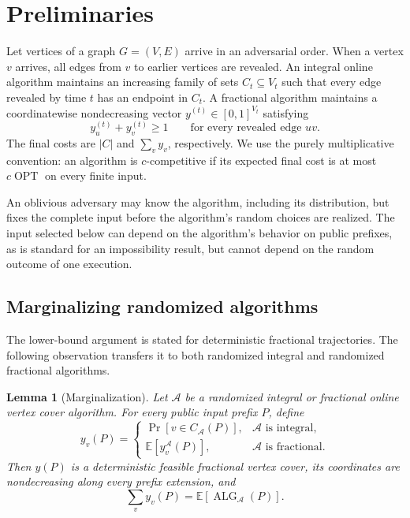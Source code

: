 \documentclass[11pt,letterpaper]{article}
\newtheorem{lemma}[theorem]{Lemma}
\theoremstyle{definition}
\theoremstyle{remark}
\newcommand{\ALG}{\operatorname{ALG}}
\newcommand{\OPT}{\operatorname{OPT}}
\begin{document}
\section{Preliminaries}\label{sec:preliminaries}

Let vertices of a graph $G=(V,E)$ arrive in an adversarial order.
When a vertex $v$ arrives, all edges from $v$ to earlier vertices are revealed.
An integral online algorithm maintains an increasing family of sets $C_t\subseteq V_t$ such that every edge revealed by time $t$ has an endpoint in $C_t$.
A fractional algorithm maintains a coordinatewise nondecreasing vector $y^{(t)}\in[0,1]^{V_t}$ satisfying
\begin{equation}\label{eq:edge-cover} y_u^{(t)}+y_v^{(t)}\ge1 \qquad\text{for every revealed edge }uv. \end{equation}
The final costs are $|C|$ and $\sum_v y_v$, respectively.
We use the purely multiplicative convention: an algorithm is $c$-competitive if its expected final cost is at most $c\OPT$ on every finite input.

An oblivious adversary may know the algorithm, including its distribution, but fixes the complete input before the algorithm's random choices are realized.
The input selected below can depend on the algorithm's behavior on public prefixes, as is standard for an impossibility result, but cannot depend on the random outcome of one execution.

\subsection{Marginalizing randomized algorithms}

The lower-bound argument is stated for deterministic fractional trajectories.
The following observation transfers it to both randomized integral and randomized fractional algorithms.

\begin{lemma}[Marginalization]\label{lem:marginalization}
Let $\mathcal A$ be a randomized integral or fractional online vertex cover algorithm.
For every public input prefix $P$, define
\begin{equation}\label{eq:marginal} y_v(P)=\begin{cases} \Pr[v\in C_{\mathcal A}(P)], & \mathcal A\text{ is integral},\\ \mathbb E[y_v^{\mathcal A}(P)], & \mathcal A\text{ is fractional}. \end{cases} \end{equation}
Then $y(P)$ is a deterministic feasible fractional vertex cover, its coordinates are nondecreasing along every prefix extension, and
\begin{equation}\label{eq:marginal-cost} \sum_v y_v(P)=\mathbb E[\ALG_{\mathcal A}(P)]. \end{equation}
\end{lemma}
\end{document}

